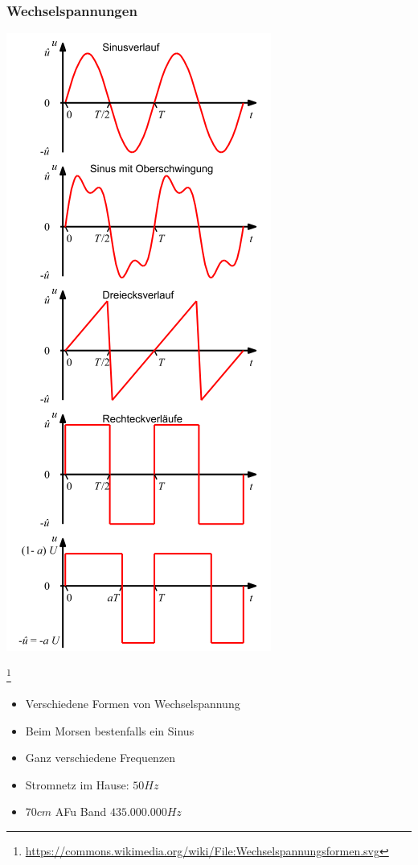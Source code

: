 \begin{frame}
    \frametitle{Wechselspannungen}
	\begin{minipage}{0.4\textwidth}
        \includegraphics[width=.8\textwidth]{e02/Wechselspannungsformen.png}
	\end{minipage}
	\footnote{\tiny \url{https://commons.wikimedia.org/wiki/File:Wechselspannungsformen.svg}}
	\begin{minipage}{0.4\textwidth}	
	\begin{itemize}
		\item Verschiedene Formen von Wechselspannung
		\item Beim Morsen bestenfalls ein Sinus
		\item Ganz verschiedene Frequenzen
		\item Stromnetz im Hause: $50Hz$ 
		\item $70cm$ AFu Band $435.000.000Hz$
	\end{itemize}
	\end{minipage}
\end{frame}

